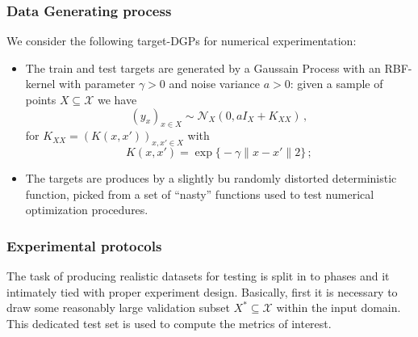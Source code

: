 \documentclass[a4paper,14pt]{article}
\newcommand{\Ncal}{\mathcal{N}}
\newcommand{\Xcal}{\mathcal{X}}
\begin{document}

\subsubsection{Data Generating process} %
\label{ssub:data_generating_process}

We consider the following target-DGPs for numerical experimentation:
\begin{itemize}
    \item The train and test targets are generated by a Gaussain Process with
    an RBF-kernel with parameter $\gamma>0$ and noise variance $a>0$: given
    a sample of points $X\subseteq \Xcal$ we have
    $$ (y_x)_{x\in X} \sim \Ncal_X(0, a I_X + K_{XX})\,, $$
    for $K_{XX} = (K(x,x'))_{x,x'\in X}$ with
    $$ K(x,x') = \mathop{\text{exp}}\biggl\{- \gamma \|x-x'\|2 \biggr\}\,; $$
    \item The targets are produces by a slightly bu randomly distorted deterministic
    function, picked from a set of ``nasty'' functions used to test numerical
    optimization procedures.
\end{itemize}


\subsubsection{Experimental protocols} %
\label{ssub:experimental_protocols}

The task of producing realistic datasets for testing is split in to phases and it
intimately tied with proper experiment design. Basically, first it is necessary to
draw some reasonably large validation subset $X^*\subseteq \Xcal$ within the input
domain. This dedicated test set is used to compute the metrics of interest.
\end{document}
